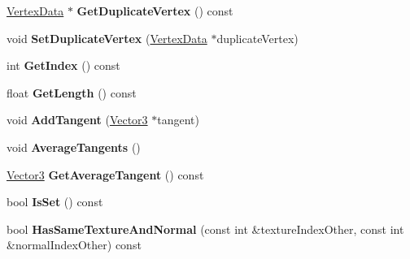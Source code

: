 \begin{DoxyCompactItemize}
\mbox{\label{class_flounder_1_1_vertex_data_aae52e11dc313e22058a0ae764e81e199}} 
\hyperlink{class_flounder_1_1_vertex_data}{Vertex\+Data} $\ast$ {\bfseries Get\+Duplicate\+Vertex} () const
\item 
\mbox{\label{class_flounder_1_1_vertex_data_a9ffc50b767c45afc1595578c41a01e21}} 
void {\bfseries Set\+Duplicate\+Vertex} (\hyperlink{class_flounder_1_1_vertex_data}{Vertex\+Data} $\ast$duplicate\+Vertex)
\item 
\mbox{\label{class_flounder_1_1_vertex_data_aedde8b3c2469e9335bd97c5956d0ad3b}} 
int {\bfseries Get\+Index} () const
\item 
\mbox{\label{class_flounder_1_1_vertex_data_a5c963bea129d3c4ac33186af8e834211}} 
float {\bfseries Get\+Length} () const
\item 
\mbox{\label{class_flounder_1_1_vertex_data_a82ff86f29c348f499fef1163b8532bfc}} 
void {\bfseries Add\+Tangent} (\hyperlink{class_flounder_1_1_vector3}{Vector3} $\ast$tangent)
\item 
\mbox{\label{class_flounder_1_1_vertex_data_aec2332767de7b70d4abea094c22856c3}} 
void {\bfseries Average\+Tangents} ()
\item 
\mbox{\label{class_flounder_1_1_vertex_data_a8d6b576334cca6f8ee8c2389f13009a5}} 
\hyperlink{class_flounder_1_1_vector3}{Vector3} {\bfseries Get\+Average\+Tangent} () const
\item 
\mbox{\label{class_flounder_1_1_vertex_data_abab81076d4cbcf70833978e1357f2780}} 
bool {\bfseries Is\+Set} () const
\item 
\mbox{\label{class_flounder_1_1_vertex_data_a4a2f3b14c30074e3189e17f1098ee319}} 
bool {\bfseries Has\+Same\+Texture\+And\+Normal} (const int \&texture\+Index\+Other, const int \&normal\+Index\+Other) const
\end{DoxyCompactItemize}
